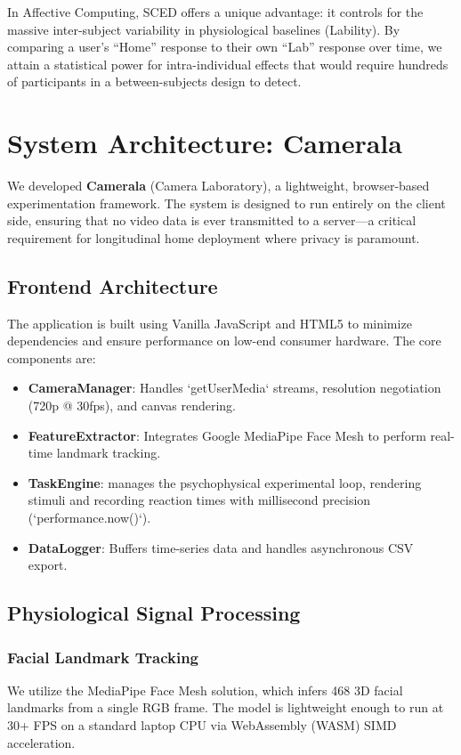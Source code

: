 \documentclass[journal]{IEEEtran}
\begin{document}
In Affective Computing, SCED offers a unique advantage: it controls for the massive inter-subject variability in physiological baselines (Lability). By comparing a user's ``Home'' response to their own ``Lab'' response over time, we attain a statistical power for intra-individual effects that would require hundreds of participants in a between-subjects design to detect.

\section{System Architecture: Camerala}

We developed \textbf{Camerala} (Camera Laboratory), a lightweight, browser-based experimentation framework. The system is designed to run entirely on the client side, ensuring that no video data is ever transmitted to a server—a critical requirement for longitudinal home deployment where privacy is paramount.

\subsection{Frontend Architecture}
The application is built using Vanilla JavaScript and HTML5 to minimize dependencies and ensure performance on low-end consumer hardware. The core components are:
\begin{itemize}
    \item \textbf{CameraManager}: Handles `getUserMedia` streams, resolution negotiation (720p @ 30fps), and canvas rendering.
    \item \textbf{FeatureExtractor}: Integrates Google MediaPipe Face Mesh \cite{mediapipe} to perform real-time landmark tracking.
    \item \textbf{TaskEngine}: manages the psychophysical experimental loop, rendering stimuli and recording reaction times with millisecond precision (`performance.now()`).
    \item \textbf{DataLogger}: Buffers time-series data and handles asynchronous CSV export.
\end{itemize}

\subsection{Physiological Signal Processing}

\subsubsection{Facial Landmark Tracking}
We utilize the MediaPipe Face Mesh solution, which infers 468 3D facial landmarks from a single RGB frame. The model is lightweight enough to run at 30+ FPS on a standard laptop CPU via WebAssembly (WASM) SIMD acceleration.
\end{document}
